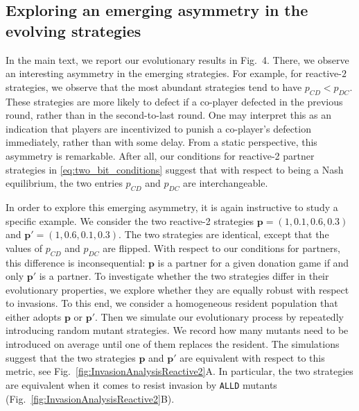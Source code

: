 \documentclass[9pt,twoside,lineno]{pnas-new}
\theoremstyle{plainCl1}
\theoremstyle{plainCl2}
\def\alld{\texttt{ALLD}}
\begin{document}

\subsection{Exploring an emerging asymmetry in the evolving strategies}

In the main text, we report our evolutionary results in Fig.~4. 
There, we observe an interesting asymmetry in the emerging strategies. 
For example, for reactive-$2$ strategies, we observe that the most abundant strategies tend to have $p_{CD}\!<\!p_{DC}$. 
These strategies are more likely to defect if a co-player defected in the previous round, rather than in the second-to-last round. 
One may interpret this as an indication that players are incentivized to punish a co-player's defection immediately, rather than with some delay. 
From a static perspective, this asymmetry is remarkable. 
After all, our conditions for reactive-2 partner strategies in \eqref{eq:two_bit_conditions} suggest that with respect to being a Nash equilibrium, the two entries $p_{CD}$ and $p_{DC}$ are interchangeable. 

In order to explore this emerging asymmetry, it is again instructive to study a specific example. 
We consider the two reactive-2 strategies $\mathbf{p}\!=\!(1,0.1,0.6,0.3)$ and $\mathbf{p'}\!=\!(1,0.6,0.1,0.3)$. 
The two strategies are identical, except that the values of $p_{CD}$ and $p_{DC}$ are flipped. 
With respect to our conditions for partners, this difference is inconsequential: $\mathbf{p}$ is a partner for a given donation game if and only $\mathbf{p'}$ is a partner. 
To investigate whether the two strategies differ in their evolutionary properties, we explore whether they are equally robust with respect to invasions. 
To this end, we consider a homogeneous resident population that either adopts $\mathbf{p}$ or $\mathbf{p'}$. 
Then we simulate our evolutionary process by repeatedly introducing random mutant strategies. 
We record how many mutants need to be introduced on average until one of them replaces the resident. 
The simulations suggest that the two strategies $\mathbf{p}$ and $\mathbf{p'}$ are equivalent with respect to this metric, see Fig.~\ref{fig:InvasionAnalysisReactive2}A. 
In particular, the two strategies are equivalent when it comes to resist invasion by \alld{} mutants (Fig.~\ref{fig:InvasionAnalysisReactive2}B). 
\end{document}
